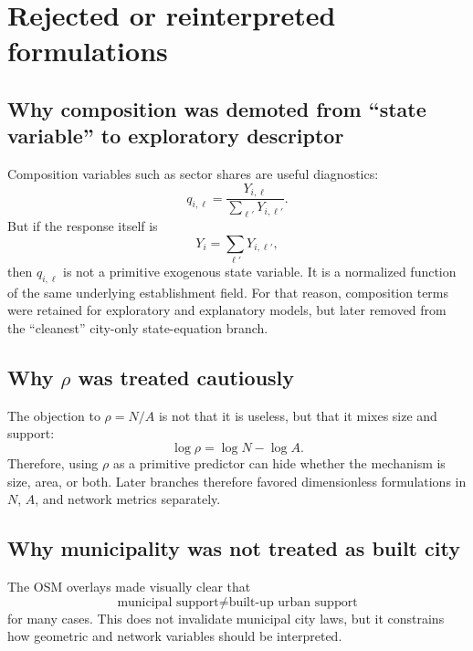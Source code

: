 \documentclass[11pt]{article}
\begin{document}
\section{Rejected or reinterpreted formulations}

\subsection{Why composition was demoted from ``state variable'' to exploratory descriptor}

Composition variables such as sector shares are useful diagnostics:
\begin{equation}
q_{i,\ell} = \frac{Y_{i,\ell}}{\sum_{\ell'} Y_{i,\ell'}}.
\end{equation}
But if the response itself is
\begin{equation}
Y_i = \sum_{\ell'} Y_{i,\ell'},
\end{equation}
then \(q_{i,\ell}\) is not a primitive exogenous state variable. It is a normalized function of the same underlying establishment field. For that reason, composition terms were retained for exploratory and explanatory models, but later removed from the ``cleanest'' city-only state-equation branch.

\subsection{Why \(\rho\) was treated cautiously}

The objection to \(\rho=N/A\) is not that it is useless, but that it mixes size and support:
\begin{equation}
\log \rho = \log N - \log A.
\end{equation}
Therefore, using \(\rho\) as a primitive predictor can hide whether the mechanism is size, area, or both. Later branches therefore favored dimensionless formulations in \(N\), \(A\), and network metrics separately.

\subsection{Why municipality was not treated as built city}

The OSM overlays made visually clear that
\begin{equation}
\text{municipal support} \neq \text{built-up urban support}
\end{equation}
for many cases. This does not invalidate municipal city laws, but it constrains how geometric and network variables should be interpreted.



\end{document}
